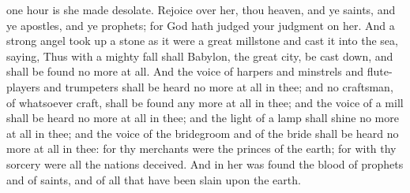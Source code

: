 one hour is she made desolate. Rejoice over her, thou heaven, and ye saints, and ye apostles, and ye prophets; for God hath judged your judgment on her.  And a strong angel took up a stone as it were a great millstone and cast it into the sea, saying, Thus with a mighty fall shall Babylon, the great city, be cast down, and shall be found no more at all. And the voice of harpers and minstrels and flute-players and trumpeters shall be heard no more at all in thee; and no craftsman, of whatsoever craft, shall be found any more at all in thee; and the voice of a mill shall be heard no more at all in thee; and the light of a lamp shall shine no more at all in thee; and the voice of the bridegroom and of the bride shall be heard no more at all in thee: for thy merchants were the princes of the earth; for with thy sorcery were all the nations deceived. And in her was found the blood of prophets and of saints, and of all that have been slain upon the earth. 

